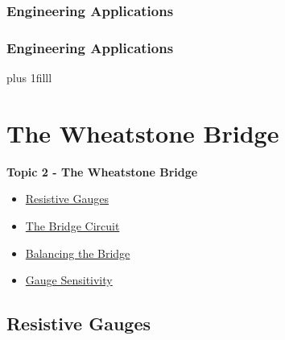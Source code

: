 \documentclass[fleqn]{beamer} %
\newcommand{\sectionIItitle}{The Wheatstone Bridge}
\newcommand{\sectionIsubsectionIVtitle}{Engineering Applications}
\newcommand{\sectionIIsubsectionItitle}{Resistive Gauges}
\newcommand{\sectionIIsubsectionIItitle}{The Bridge Circuit}
\newcommand{\sectionIIsubsectionIIItitle}{Balancing the Bridge}
\newcommand{\sectionIIsubsectionIVtitle}{Gauge Sensitivity}
\newcommand{\btVFill}{\vskip0pt plus 1filll}
\begin{document}
			\begin{frame}
				\frametitle{\sectionIsubsectionIVtitle} \scriptsize


			\end{frame}


			\begin{frame}
				\frametitle{\sectionIsubsectionIVtitle} \scriptsize

				\bigskip


				\btVFill

										
			\end{frame}

	
	\section{\sectionIItitle}\label{sectionII}

		\begin{frame}
			\large \textbf{Topic 2 - \sectionIItitle} \vspace{3mm}\\

			\begin{itemize}
				\item \hyperlink{sectionIIsubsectionI}{\sectionIIsubsectionItitle} \vspc %
				\item \hyperlink{sectionIIsubsectionII}{\sectionIIsubsectionIItitle} \vspc %
				\item \hyperlink{sectionIIsubsectionIII}{\sectionIIsubsectionIIItitle} \vspc %
				\item \hyperlink{sectionIIsubsectionIV}{\sectionIIsubsectionIVtitle} \vspc %
			\end{itemize}

		\end{frame}

		\subsection{\sectionIIsubsectionItitle}\label{sectionIIsubsectionI}
\end{document}

